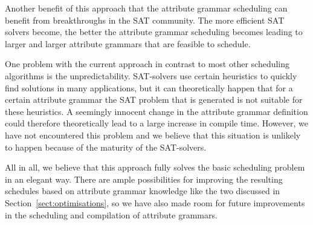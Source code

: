 \documentclass{llncs}
\newcommand{\sectref}[1]{Section~\ref{#1}}
\DeclareRobustCommand{\VAN}[3]{#2}
\begin{document}
Another benefit of this approach that the attribute grammar scheduling can benefit from breakthroughs in the SAT community. The more efficient SAT solvers become, the better the attribute grammar scheduling becomes leading to larger and larger attribute grammars that are feasible to schedule.

One problem with the current approach in contrast to most other scheduling algorithms is the unpredictability. SAT-solvers use certain heuristics to quickly find solutions in many applications, but it can theoretically happen that for a certain attribute grammar the SAT problem that is generated is not suitable for these heuristics. A seemingly innocent change in the attribute grammar definition could therefore theoretically lead to a large increase in compile time. However, we have not encountered this problem and we believe that this situation is unlikely to happen because of the maturity of the SAT-solvers.

All in all, we believe that this approach fully solves the basic scheduling problem in an elegant way. There are ample possibilities for improving the resulting schedules based on attribute grammar knowledge like the two discussed in \sectref{sect:optimisations}, so we have also made room for future improvements in the scheduling and compilation of attribute grammars.

\DeclareRobustCommand{\VAN}[3]{#3}


\end{document}
